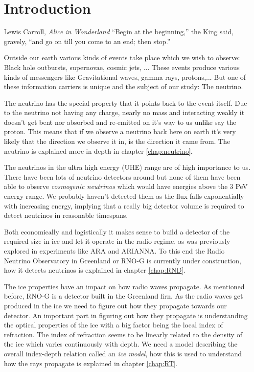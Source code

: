 \chapter*{Introduction}
\begin{chapquote}{Lewis Carroll, \textit{Alice in Wonderland}}
``Begin at the beginning,'' the King said, gravely, ``and go on till you
come to an end; then stop.''
\end{chapquote}
Outside our earth various kinds of events take place which we wish to 
observe: Black hole outbursts, supernovae, cosmic jets, ...
These events produce various kinds of messengers like 
Gravitational waves, gamma rays, protons,...
But one of these information carriers is unique and
the subject of our study: The neutrino. 

The neutrino has the special property that it points back to the event itself.
Due to the neutrino not having any charge, nearly no mass and 
interacting weakly it doesn't get bent nor absorbed and re-emitted 
on it's way to us unlike say the proton. This means that if we observe
a neutrino back here on earth it's very likely that the direction we observe
it in, is the direction it came from. The neutrino is explained more in-depth in chapter
\ref{chap:neutrino}.

The neutrinos in the ultra high energy (UHE) range are of high importance to us.
There have been lots of neutrino detectors around but none of them
have been able to observe \textit{cosmogenic neutrinos} which would have energies above
the 3 PeV energy range. We probably haven't detected them as the flux falls exponentially 
with increasing energy, implying that a really big detector volume is
required to detect neutrinos in reasonable timespans. 

Both economically and logistically it makes sense to build a detector of the
required size in ice and let it operate in the radio regime, as was previously
explored in experiments like ARA and ARIANNA.  To this end the Radio Neutrino
Observatory in Greenland or RNO-G is currently under construction, how it 
detects neutrinos is explained in chapter \ref{chap:RND}.

The ice properties have an impact on how radio waves propagate. As mentioned
before, RNO-G is a detector built in the Greenland firn. As the radio waves get
produced in the ice we need to figure out how they propagate towards our
detector. An important part in figuring out how they propagate is understanding
the optical properties of the ice with a big factor being the local index of
refraction. The index of refraction seems to be linearly related to the density of the ice which
varies continuously with depth. We need a model describing the overall index-depth relation
called an \textit{ice model}, how this is used to understand how the rays propagate
is explained in chapter \ref{chap:RT}.

